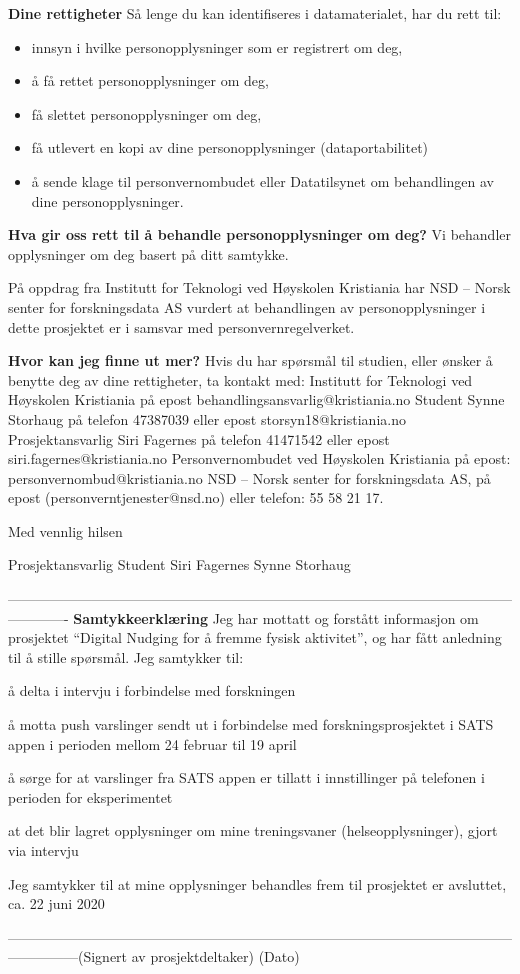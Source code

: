 \textbf{Dine rettigheter}
\bigbreak
Så lenge du kan identifiseres i datamaterialet, har du rett til:

\begin{itemize}
\item innsyn i hvilke personopplysninger som er registrert om deg, 
\item å få rettet personopplysninger om deg,
\item få slettet personopplysninger om deg, 
\item få utlevert en kopi av dine personopplysninger (dataportabilitet)
\item å sende klage til personvernombudet eller Datatilsynet om behandlingen av dine personopplysninger.
\end{itemize}
 
\textbf{Hva gir oss rett til å behandle personopplysninger om deg?}
Vi behandler opplysninger om deg basert på ditt samtykke.
 
På oppdrag fra Institutt for Teknologi ved Høyskolen Kristiania har NSD – Norsk senter for forskningsdata AS vurdert at behandlingen av personopplysninger i dette prosjektet er i samsvar med personvernregelverket.
 
\textbf{Hvor kan jeg finne ut mer?}
Hvis du har spørsmål til studien, eller ønsker å benytte deg av dine rettigheter, ta kontakt med:
Institutt for Teknologi ved Høyskolen Kristiania på epost behandlingsansvarlig@kristiania.no 
Student Synne Storhaug på telefon 47387039 eller epost storsyn18@kristiania.no 
Prosjektansvarlig Siri Fagernes på telefon 41471542 eller epost siri.fagernes@kristiania.no 
Personvernombudet ved Høyskolen Kristiania på epost: personvernombud@kristiania.no  
NSD – Norsk senter for forskningsdata AS, på epost (personverntjenester@nsd.no) eller telefon: 55 58 21 17.
 
 
Med vennlig hilsen
 
Prosjektansvarlig                                       									Student
Siri Fagernes																					Synne Storhaug
 
 
-------------------------------------------------------------------------------------------------------------------------
\textbf{Samtykkeerklæring}
Jeg har mottatt og forstått informasjon om prosjektet “Digital Nudging for å fremme fysisk aktivitet”, og har fått anledning til å stille spørsmål. Jeg samtykker til:
 
 \begin{todolist}
    \item å delta i intervju i forbindelse med forskningen
    \item å motta push varslinger sendt ut i forbindelse med forskningsprosjektet i SATS appen i perioden mellom 24 februar til 19 april
       \item å sørge for at varslinger fra SATS appen er tillatt i innstillinger på telefonen i perioden for eksperimentet 
          \item at det blir lagret opplysninger om mine treningsvaner (helseopplysninger), gjort via intervju       
\end{todolist}

Jeg samtykker til at mine opplysninger behandles frem til prosjektet er avsluttet, ca. 22 juni 2020
 
 
---------------------------------------------------------------------------------------------------------------------------(Signert av prosjektdeltaker) 							(Dato)

